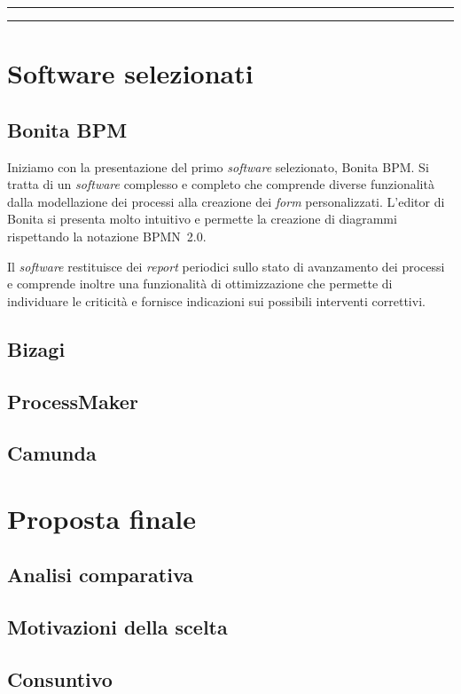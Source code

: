 \documentclass[a4paper,10pt]{article}
\newcommand{\inglese}[1]{\foreignlanguage{english}{\textit{#1}}}
\newcommand{\sw}{\inglese{software}\xspace}
\newcommand{\cambioslide}{%
\begin{center}
\Large
\rule[4pt]{0.2\linewidth}{.7pt} \ding{167} \rule[4pt]{0.2\linewidth}{.7pt}
\end{center}
}
\begin{document}
\cambioslide

\section{Software selezionati}

\subsection{Bonita BPM}
Iniziamo con la presentazione del primo \sw selezionato, Bonita BPM. Si tratta di un \sw complesso e completo che comprende diverse funzionalità dalla modellazione dei processi alla creazione dei \inglese{form} personalizzati.
L'editor di Bonita si presenta molto intuitivo e permette la creazione di diagrammi rispettando la notazione BPMN~2.0.

Il \sw restituisce dei \inglese{report} periodici sullo stato di avanzamento dei processi e comprende inoltre una funzionalità di ottimizzazione che permette di individuare le criticità e fornisce indicazioni sui possibili interventi correttivi.

\subsection{Bizagi}

\subsection{ProcessMaker}

\subsection{Camunda}

\section{Proposta finale}

\subsection{Analisi comparativa}

\subsection{Motivazioni della scelta}

\subsection{Consuntivo}
\end{document}

